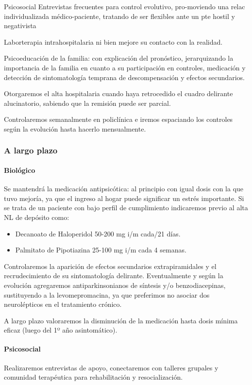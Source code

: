 Psicosocial Entrevistas frecuentes para control evolutivo, pro-moviendo una relac individualizada médico-paciente, tratando de ser flexibles ante un pte hostil y negativista

Laborterapia intrahospitalaria ni bien mejore su contacto con la realidad.

Psicoeducación de la familia: con explicación del pronóstico, jerarquizando la importancia de la familia en cuanto a su participación en controles, medicación y detección de sintomatología temprana de descompensación y efectos secundarios.

Otorgaremos el alta hospitalaria cuando haya retrocedido el cuadro delirante alucinatorio, sabiendo que la remisión puede ser parcial.

Controlaremos semanalmente en policlínica e iremos espaciando los controles según la evolución hasta hacerlo mensualmente.

\subsubsection*{A largo plazo}
\paragraph*{Biológico}
Se mantendrá la medicación antipsicótica\cite{ostuzzi2022preventing}: al principio con igual dosis con la que tuvo mejoría, ya que el ingreso al hogar puede significar un estrés importante. Si se trata de un paciente con bajo perfil de cumplimiento indicaremos previo al alta NL de depósito como:
\begin{itemize}
    \item Decanoato de Haloperidol 50-200 mg i/m cada/21 días.
    \item Palmitato de Pipotiazina 25-100 mg i/m cada 4 semanas.
\end{itemize}
Controlaremos la aparición de efectos secundarios extrapiramidales y el recrudecimiento de su sintomatología delirante. Eventualmente y según la evolución agregaremos antiparkinsonianos de síntesis y/o benzodiacepinas, sustituyendo a la levomepromacina, ya que preferimos no asociar dos neurolépticos en el tratamiento crónico.

A largo plazo valoraremos la disminución de la medicación hasta dosis mínima eficaz (luego del 1º año asintomático).
\paragraph*{Psicosocial}
Realizaremos entrevistas de apoyo, conectaremos con talleres grupales y comunidad terapéutica para rehabilitación y resocialización.

